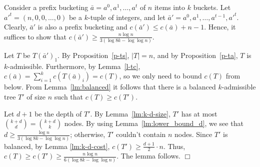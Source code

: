 \documentclass[11pt]{article}
\newcommand{\qed}{$\Box$}
\newenvironment{proofof}[1]{\noindent{\it Proof of #1. }} {{\qed}}
\begin{document}
\begin{proofof}{Lemma \ref{l-lbb}}
Consider a prefix bucketing $\bar{a} = a^0,a^1,\dotsc,a^t$ of $n$ items into $k$ buckets.
Let $a'^t = (n,0,0,\dotsc,0)$ be a $k$-tuple of integers,
and let  $\bar{a}' = a^0,a^1,\dotsc,a^{t-1},a'^t$.
Clearly, $\bar{a}'$ is also a prefix bucketing and $c(\bar{a}') \le c(\bar{a}) + n-1$. 
Hence, it suffices to show that $c(\bar{a}') \ge \frac{n \log n}{3 (\log 8k - \log \log n)}$.

Let $T$ be $T(\bar{a}')_1$.
By Proposition~\ref{p-ts}, $|T|=n$, and by Proposition~\ref{p-ta}, $T$ is $k$-admissible.
Furthermore, by Lemma~\ref{l-tc}, $c(\bar{a}) = \sum_{i=1}^k c(T(\bar{a})_i) = c(T)$,
so we only need to bound $c(T)$ from below.
From Lemma~\ref{lm:balanced} it follows that
there is a balanced $k$-admissible tree $T'$ of size $n$ such that $c(T) \geq c(T')$.

Let $d+1$ be the depth of $T'$.
By Lemma~\ref{lm:k-d-size}, $T'$ has at most $\binom{k + d}{d} = \binom{k + d}{k}$ nodes.
By using Lemma~\ref{lm:lower_bound_d}, we see that
$d \ge \frac{\log n}{3 (\log 8k - \log \log n)}$; otherwise, $T'$ couldn't contain $n$ nodes.
Since $T'$ is balanced, by Lemma \ref{lm:k-d-cost}, $c(T') \ge \frac{d+1}{2} \cdot n$.
Thus, $c(T) \ge c(T') \ge \frac{n \log n}{6 (\log 8k - \log \log n)}$. The lemma follows.
\end{proofof}
\end{document}
